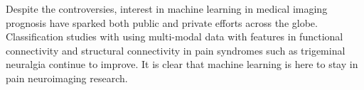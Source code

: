 Despite the controversies, interest in machine learning in medical imaging prognosis have sparked both public and private efforts across the globe. Classification studies with using multi-modal data with features in functional connectivity and structural connectivity in pain syndromes such as trigeminal neuralgia continue to improve. It is clear that machine learning is here to stay in pain neuroimaging research. 



